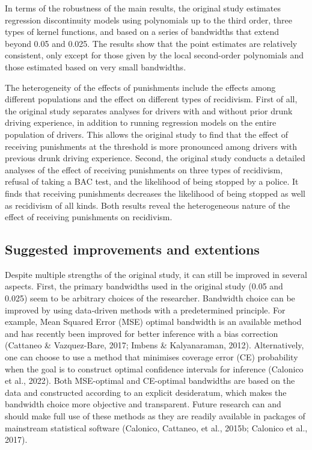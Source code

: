 \documentclass[
  11pt,
]{article}
\begin{document}
In terms of the robustness of the main results, the original study
estimates regression discontinuity models using polynomials up to the
third order, three types of kernel functions, and based on a series of
bandwidths that extend beyond 0.05 and 0.025. The results show that the
point estimates are relatively consistent, only except for those given
by the local second-order polynomials and those estimated based on very
small bandwidths.

The heterogeneity of the effects of punishments include the effects
among different populations and the effect on different types of
recidivism. First of all, the original study separates analyses for
drivers with and without prior drunk driving experience, in addition to
running regression models on the entire population of drivers. This
allows the original study to find that the effect of receiving
punishments at the threshold is more pronounced among drivers with
previous drunk driving experience. Second, the original study conducts a
detailed analyses of the effect of receiving punishments on three types
of recidivism, refusal of taking a BAC test, and the likelihood of being
stopped by a police. It finds that receiving punishments decreases the
likelihood of being stopped as well as recidivism of all kinds. Both
results reveal the heterogeneous nature of the effect of receiving
punishments on recidivism.

\hypertarget{suggested-improvements-and-extentions}{%
\subsection{Suggested improvements and
extentions}\label{suggested-improvements-and-extentions}}

Despite multiple strengths of the original study, it can still be
improved in several aspects. First, the primary bandwidths used in the
original study (0.05 and 0.025) seem to be arbitrary choices of the
researcher. Bandwidth choice can be improved by using data-driven
methods with a predetermined principle. For example, Mean Squared Error
(MSE) optimal bandwidth is an available method and has recently been
improved for better inference with a bias correction (Cattaneo \&
Vazquez-Bare, 2017; Imbens \& Kalyanaraman, 2012). Alternatively, one
can choose to use a method that minimises coverage error (CE)
probability when the goal is to construct optimal confidence intervals
for inference (Calonico et al., 2022). Both MSE-optimal and CE-optimal
bandwidths are based on the data and constructed according to an
explicit desideratum, which makes the bandwidth choice more objective
and transparent. Future research can and should make full use of these
methods as they are readily available in packages of mainstream
statistical software (Calonico, Cattaneo, et al., 2015b; Calonico et
al., 2017).
\end{document}

